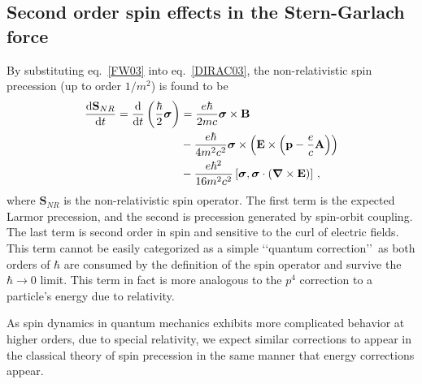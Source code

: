 \subsection{Second order spin effects in the Stern-Garlach force}
\label{sec:spinspin}
By substituting eq.~\eqref{FW03} into eq.~\eqref{DIRAC03}, the non-relativistic spin precession (up to order $1/m^{2}$) is found to be
\begin{alignat}{1}
  \notag\frac{\mathrm{d}\mathbf{S}_{NR}}{\mathrm{d}t}=\frac{\mathrm{d}}{\mathrm{d}t}\left(\frac{\hbar}{2}\boldsymbol{\sigma}\right)&=\frac{e\hbar}{2mc}\boldsymbol{\sigma}\times\mathbf{B}\\
  \notag&-\frac{e\hbar}{4m^{2}c^{2}}\boldsymbol{\sigma}\times\left(\mathbf{E}\times\left(\mathbf{p}-\frac{e}{c}\mathbf{A}\right)\right)\\
  \label{SPIN01}&-\frac{e\hbar^{2}}{16m^{2}c^{2}}\left[\boldsymbol{\sigma},\boldsymbol{\sigma}\cdot\left(\boldsymbol{\nabla}\times\mathbf{E}\right)\right]\,,
\end{alignat}
where $\mathbf{S}_{NR}$ is the non-relativistic spin operator. The first term is the expected Larmor precession, and the second is precession generated by spin-orbit coupling. The last term is second order in spin and sensitive to the curl of electric fields. This term cannot be easily categorized as a simple \lq\lq quantum correction\rq\rq\, as both orders of $\hbar$ are consumed by the definition of the spin operator and survive the $\hbar\rightarrow 0$ limit. This term in fact is more analogous to the $p^{4}$ correction to a particle's energy due to relativity.

As spin dynamics in quantum mechanics exhibits more complicated behavior at higher orders, due to special relativity, we expect similar corrections to appear in the classical theory of spin precession in the same manner that energy corrections appear.

